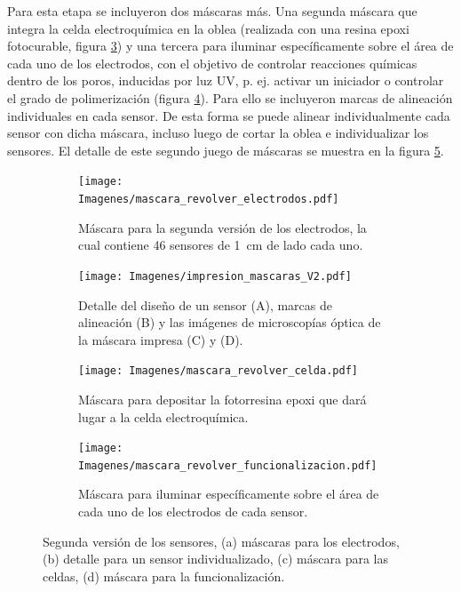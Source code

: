 {		     Para esta etapa se incluyeron dos máscaras más. Una segunda máscara que integra la celda electroquímica en la oblea (realizada con una resina epoxi fotocurable, figura \ref{fig:mascara_su8}) y una tercera para iluminar específicamente sobre el área de cada uno de los electrodos, con el objetivo de controlar reacciones químicas dentro de los poros, inducidas por luz UV, p. ej. activar un iniciador o controlar el grado de polimerización  (figura \ref{fig:mascara_funcionalizacion}).\cite{Andrieu-Brunsen2015,Herzog2015,Silies2015} Para ello se incluyeron marcas de alineación individuales en cada sensor. De esta forma se puede alinear individualmente cada sensor con dicha máscara, incluso luego de cortar la oblea e individualizar los sensores. El detalle de este segundo juego de máscaras se muestra en la figura \ref{fig:impresion_diseno_V2}. \vspace*{-0.3cm}
					\begin{figure}[th!]
			 	   	    \centering
			 	   	    \begin{subfigure}[t]{0.495\textwidth}
			        	\texttt{[image: Imagenes/mascara\_revolver\_electrodos.pdf]}
			       		\caption{Máscara para la segunda versión de los electrodos, la cual contiene 46 sensores de \SI{1}{cm} de lado cada uno.}
			         	\label{fig:mascara_v2}
			     		\end{subfigure}
			     		\begin{subfigure}[t]{0.495\textwidth}
			     		\texttt{[image: Imagenes/impresion\_mascaras\_V2.pdf]}
			    		\caption{Detalle del diseño de un sensor (A), marcas de alineación (B) y las imágenes de microscopías óptica de la máscara impresa (C) y (D).}
			    		\label{fig:impresion_diseno_v2_b}	
						\end{subfigure}
			     		\begin{subfigure}[t]{0.495\textwidth}
			         	\texttt{[image: Imagenes/mascara\_revolver\_celda.pdf]}
			        	\caption{Máscara para depositar la fotorresina epoxi que dará lugar a la celda electroquímica.}
			         	\label{fig:mascara_su8}
			     		\end{subfigure}
						\begin{subfigure}[t]{0.495\textwidth}
			     		\texttt{[image: Imagenes/mascara\_revolver\_funcionalizacion.pdf]}
			        	\caption{Máscara para iluminar específicamente sobre el área de cada uno de los electrodos de cada sensor.}
			         	\label{fig:mascara_funcionalizacion}
			     		\end{subfigure}
			     		\vspace*{-0.3cm}
			     		\caption[Juego de máscara. Segunda versión]{Segunda versión de los sensores, (a) máscaras  para los electrodos, (b) detalle para un sensor individualizado, (c) máscara para las celdas, (d) máscara para la funcionalización.}
			     		\label{fig:impresion_diseno_V2}
			     	   	\end{figure}
	
}
